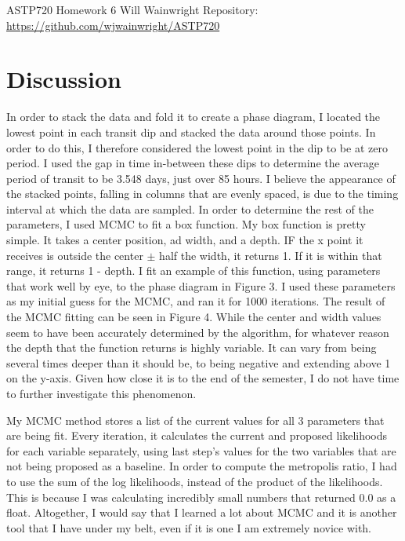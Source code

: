 \documentclass[twocolumn,11pt]{article}
\begin{document}
\pagestyle{plain}
\onecolumn
ASTP720 
\newline Homework 6
\newline Will Wainwright
\newline Repository: \href{https://github.com/wjwainwright/ASTP720}{https://github.com/wjwainwright/ASTP720}

\section*{Discussion}
In order to stack the data and fold it to create a phase diagram, I located the lowest point in each transit dip and stacked the data around those points. In order to do this, I therefore considered the lowest point in the dip to be at zero period. I used the gap in time in-between these dips to determine the average period of transit to be 3.548 days, just over 85 hours. I believe the appearance of the stacked points, falling in columns that are evenly spaced, is due to the timing interval at which the data are sampled. In order to determine the rest of the parameters, I used MCMC to fit a box function. My box function is pretty simple. It takes a center position, ad width, and a depth. IF the x point it receives is outside the center $\pm$ half the width, it returns 1. If it is within that range, it returns 1 - depth. I fit an example of this function, using parameters that work well by eye, to the phase diagram in Figure 3. I used these parameters as my initial guess for the MCMC, and ran it for 1000 iterations. The result of the MCMC fitting can be seen in Figure 4. While the center and width values seem to have been accurately determined by the algorithm, for whatever reason the depth that the function returns is highly variable. It can vary from being several times deeper than it should be, to being negative and extending above 1 on the y-axis. Given how close it is to the end of the semester, I do not have time to further investigate this phenomenon. 

My MCMC method stores a list of the current values for all 3 parameters that are being fit. Every iteration, it calculates the current and proposed likelihoods for each variable separately, using last step's values for the two variables that are not being proposed as a baseline. In order to compute the metropolis ratio, I had to use the sum of the log likelihoods, instead of the product of the likelihoods. This is because I was calculating incredibly small numbers that returned 0.0 as a float. Altogether, I would say that I learned a lot about MCMC and it is another tool that I have under my belt, even if it is one I am extremely novice with.
\end{document}
